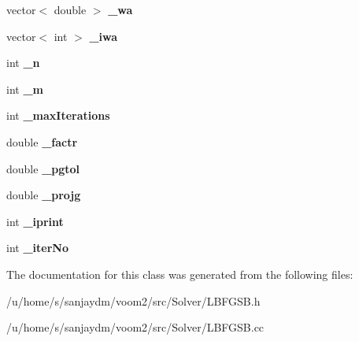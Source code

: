 \begin{DoxyCompactItemize}
\item 
\hypertarget{classvoom_1_1_l_b_f_g_s_b_a40740e8dbec247992f5d6b9385bab2c9}{
vector$<$ double $>$ {\bfseries \_\-wa}}
\label{classvoom_1_1_l_b_f_g_s_b_a40740e8dbec247992f5d6b9385bab2c9}

\item 
\hypertarget{classvoom_1_1_l_b_f_g_s_b_a502327043d8548b71a77691f2c9e752c}{
vector$<$ int $>$ {\bfseries \_\-iwa}}
\label{classvoom_1_1_l_b_f_g_s_b_a502327043d8548b71a77691f2c9e752c}

\item 
\hypertarget{classvoom_1_1_l_b_f_g_s_b_a21deb6a07f5597430339136cf780c88f}{
int {\bfseries \_\-n}}
\label{classvoom_1_1_l_b_f_g_s_b_a21deb6a07f5597430339136cf780c88f}

\item 
\hypertarget{classvoom_1_1_l_b_f_g_s_b_a42ecdefb7f7e24648bc742846036ea48}{
int {\bfseries \_\-m}}
\label{classvoom_1_1_l_b_f_g_s_b_a42ecdefb7f7e24648bc742846036ea48}

\item 
\hypertarget{classvoom_1_1_l_b_f_g_s_b_a6748820bc5e27c952c6a0ecab9795c74}{
int {\bfseries \_\-maxIterations}}
\label{classvoom_1_1_l_b_f_g_s_b_a6748820bc5e27c952c6a0ecab9795c74}

\item 
\hypertarget{classvoom_1_1_l_b_f_g_s_b_a112a42abaa1091e23c65d221e42e9503}{
double {\bfseries \_\-factr}}
\label{classvoom_1_1_l_b_f_g_s_b_a112a42abaa1091e23c65d221e42e9503}

\item 
\hypertarget{classvoom_1_1_l_b_f_g_s_b_a13d2aec66d42a8ad933290d9a574ade8}{
double {\bfseries \_\-pgtol}}
\label{classvoom_1_1_l_b_f_g_s_b_a13d2aec66d42a8ad933290d9a574ade8}

\item 
\hypertarget{classvoom_1_1_l_b_f_g_s_b_a9e4bf52e5affa003434589d696644e5d}{
double {\bfseries \_\-projg}}
\label{classvoom_1_1_l_b_f_g_s_b_a9e4bf52e5affa003434589d696644e5d}

\item 
\hypertarget{classvoom_1_1_l_b_f_g_s_b_a2d7eb532eea25e7675e2866c27f30c8b}{
int {\bfseries \_\-iprint}}
\label{classvoom_1_1_l_b_f_g_s_b_a2d7eb532eea25e7675e2866c27f30c8b}

\item 
\hypertarget{classvoom_1_1_l_b_f_g_s_b_a7babc694ce25cd8fea76f223ef2b4914}{
int {\bfseries \_\-iterNo}}
\label{classvoom_1_1_l_b_f_g_s_b_a7babc694ce25cd8fea76f223ef2b4914}

\end{DoxyCompactItemize}


The documentation for this class was generated from the following files:\begin{DoxyCompactItemize}
\item 
/u/home/s/sanjaydm/voom2/src/Solver/LBFGSB.h\item 
/u/home/s/sanjaydm/voom2/src/Solver/LBFGSB.cc\end{DoxyCompactItemize}
